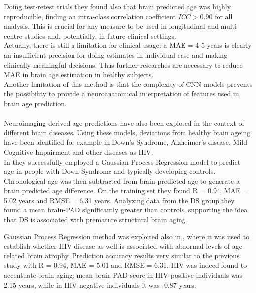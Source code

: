 \documentclass{article}
\begin{document}
	Doing test-retest trials they found also that brain predicted age was highly reproducible, finding an intra-class correlation coefficient $ICC > 0.90$ for all analysis. This is crucial for any measure to be used in longitudinal and multi-centre studies and, potentially, in future clinical settings. 
	\\
	Actually, there is still a limitation for clinical usage: a MAE = 4-5 years is clearly an insufficient precision for doing estimates in individual case and making clinically-meaningful decisions. Thus further researches are necessary to reduce MAE in brain age estimation in healthy subjects.
	\\ Another limitation of this method is that the complexity of CNN models prevents the possibility to provide a neuroanatomical interpretation of features used in brain age prediction.
	\\
	\\
	Neuroimaging-derived age predictions have also been explored in the context of different brain diseases. Using these models, deviations from healthy brain ageing have been identified for example in Down's Syndrome, Alzheimer's disease, Mild Cognitive Impairment and other diseases as HIV.
	\\
	In \cite{Cole2017b} they successfully employed a Gaussian Process Regression model to predict age in people with Down Syndrome and typically developing controls. Chronological age was then subtracted from brain-predicted age to generate a brain predicted age difference. On the training set they found R = 0.94, MAE = 5.02 years and RMSE = 6.31 years. Analyzing data from the DS group they found a mean brain-PAD significantly greater than controls, supporting the idea that DS is associated with premature structural brain aging.
	
	Gaussian Process Regression method was exploited also in \cite{Cole2017c}, where it was used to establish whether HIV disease as well is associated with abnormal levels of age-related brain atrophy. Prediction accuracy results very similar to the previous study with R = 0.94, MAE = 5.01 and RMSE = 6.31. HIV was indeed found to accentuate brain aging: mean brain PAD score in HIV-positive individuals was 2.15 years, while in HIV-negative individuals it was -0.87 years. 
	
	
	
\end{document}
